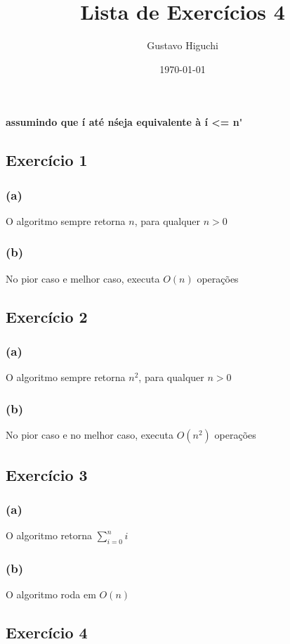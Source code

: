 \documentclass{article}
\title{Lista de Exercícios 4}
\author{Gustavo Higuchi}
\date{\today}
\begin{document}
\maketitle

\tableofcontents
\newpage


\chapter{}
\textbf{assumindo que \'i até n\' seja equivalente à \'i <= n\' }
\section{Exercício 1}
\subsection*{(a)}
O algoritmo sempre retorna $n$, para qualquer $n>0$
\subsection*{(b)}
No pior caso e melhor caso, executa $O(n)$ operações

\section{Exercício 2}
\subsection*{(a)}
O algoritmo sempre retorna $n^2$, para qualquer $n>0$
\subsection*{(b)}
No pior caso e no melhor caso, executa $O(n^2)$ operações

\section{Exercício 3}
\subsection*{(a)}
O algoritmo retorna $\sum\limits_{i=0}^{n} i$
\subsection*{(b)}
O algoritmo roda em $O(n)$

\section{Exercício 4}
\end{document}
